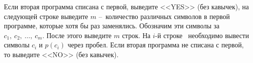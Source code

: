 Если вторая программа списана с первой, выведите <<YES>> (без кавычек), на следующей строке выведите $m$ -- количество различных символов в первой программе, которые хотя бы раз заменялись. Обозначим эти символы за $c_1,\ c_2,\ \ldots, \  c_m$. После этого выведите $m$ строк. На $i$-й строке  необходимо вывести символы $c_i$ и $p(c_i)$ через пробел. Если вторая программа не списана с первой, то выведите <<NO>> (без кавычек).
